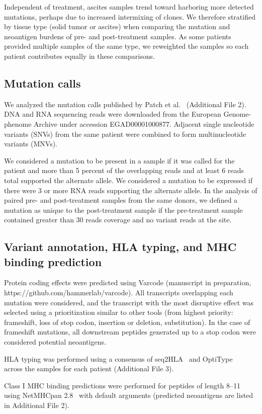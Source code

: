 \documentclass{bmcart}
\begin{document}
Independent of treatment, ascites samples trend toward harboring more detected mutations, perhaps due to increased intermixing of clones. We therefore stratified by tissue type (solid tumor or ascites) when comparing the mutation and neoantigen burdens of pre- and post-treatment samples. As some patients provided multiple samples of the same type, we reweighted the samples so each patient contributes equally in these comparisons.

\subsection*{Mutation calls}
We analyzed the mutation calls published by Patch et al.~\cite{Patch_2015} (Additional File 2). DNA and RNA sequencing reads were downloaded from the European Genome-phenome Archive under accession EGAD00001000877. Adjacent single nucleotide variants (SNVs) from the same patient were combined to form multinucleotide variants (MNVs). 

We considered a mutation to be present in a sample if it was called for the patient and more than 5 percent of the overlapping reads and at least 6 reads total supported the alternate allele. We considered a mutation to be expressed if there were 3 or more RNA reads supporting the alternate allele. In the analysis of paired pre- and post-treatment samples from the same donors, we defined a mutation as unique to the post-treatment sample if the pre-treatment sample contained greater than 30 reads coverage and no variant reads at the site.

\subsection*{Variant annotation, HLA typing, and MHC binding prediction}
\begin{sloppypar}
Protein coding effects were predicted using Varcode (manuscript in preparation, https://github.com/hammerlab/varcode). All transcripts overlapping each mutation were considered, and the transcript with the most disruptive effect was selected using a prioritization similar to other tools (from highest priority: frameshift, loss of stop codon, insertion or deletion, substitution). In the case of frameshift mutations, all downstream peptides generated up to a stop codon were considered potential neoantigens.

HLA typing was performed using a consensus of seq2HLA~\cite{Boegel_2012} and OptiType ~\cite{Szolek_2014} across the samples for each patient (Additional File 3).

Class I MHC binding predictions were performed for peptides of length 8--11 using NetMHCpan 2.8~\cite{Lundegaard_2008} with default arguments (predicted neoantigens are listed in Additional File 2).
\end{sloppypar}
\end{document}
